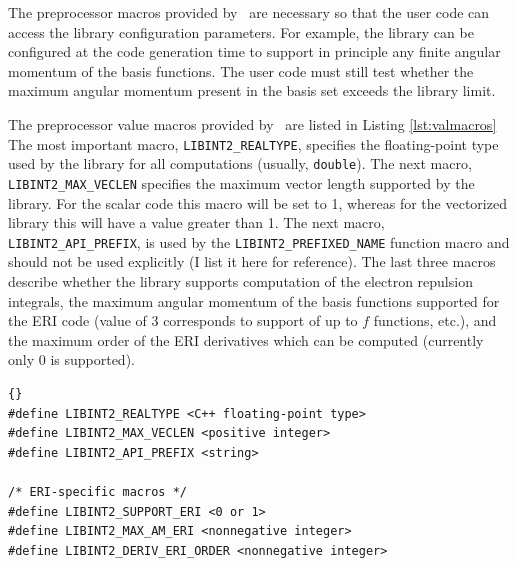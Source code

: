 \documentclass[10pt]{article}
\begin{document}
The preprocessor macros provided by \libinth\ are necessary so that the user code can
access the library configuration parameters. For example, the library can be configured at the code generation time
to support in principle any finite angular momentum of the basis functions. The user code must still
test whether the maximum angular momentum present in the basis set exceeds the library limit.

The preprocessor value macros provided by \libinth\ are listed in Listing
\ref{lst:valmacros}
The most important macro, {\tt LIBINT2\_REALTYPE}, specifies the floating-point type
used by the library for all computations (usually, {\tt double}).
The next macro, {\tt LIBINT2\_MAX\_VECLEN} specifies the maximum vector length supported by the library. For the scalar code
this macro will be set to 1, whereas for the vectorized library this will have a value greater than
1.
The next macro, {\tt LIBINT2\_API\_PREFIX}, is used by the {\tt LIBINT2\_PREFIXED\_NAME} function macro and should not be
used explicitly (I list it here for reference).
The last three macros describe whether the library supports computation of the electron repulsion integrals,
the maximum angular momentum of the basis functions supported for the ERI code (value of 3 corresponds to support
of up to $f$ functions, etc.), and the maximum order of the
ERI derivatives which can be computed (currently only 0 is supported).

\begin{lstlisting}[label=lst:valmacros,caption=C preprocessor value macros
provided by \libinth . The angled brakets describe valid macro values.]{}
#define LIBINT2_REALTYPE <C++ floating-point type>
#define LIBINT2_MAX_VECLEN <positive integer>
#define LIBINT2_API_PREFIX <string>

/* ERI-specific macros */
#define LIBINT2_SUPPORT_ERI <0 or 1>
#define LIBINT2_MAX_AM_ERI <nonnegative integer>
#define LIBINT2_DERIV_ERI_ORDER <nonnegative integer>
\end{lstlisting}
\end{document}
